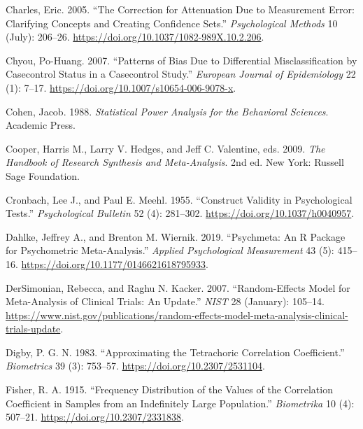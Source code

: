 \documentclass[
  letterpaper,
  DIV=11,
  numbers=noendperiod]{scrreprt}
\newlength{\cslhangindent}
\newlength{\cslentryspacingunit} %
\newenvironment{CSLReferences}[2] %
 {%
  \setlength{\parindent}{0pt}
  \ifodd #1
  \let\oldpar\par
  \def\par{\hangindent=\cslhangindent\oldpar}
  \fi
  \setlength{\parskip}{#2\cslentryspacingunit}
 }%
 {}
\begin{document}
\begin{CSLReferences}{1}{0}
\leavevmode{}%
Charles, Eric. 2005. {``The Correction for Attenuation Due to
Measurement Error: Clarifying Concepts and Creating Confidence Sets.''}
\emph{Psychological Methods} 10 (July): 206--26.
\url{https://doi.org/10.1037/1082-989X.10.2.206}.

\leavevmode{}%
Chyou, Po-Huang. 2007. {``Patterns of Bias Due to Differential
Misclassification by Case{\textendash}control Status in a
Case{\textendash}control Study.''} \emph{European Journal of
Epidemiology} 22 (1): 7--17.
\url{https://doi.org/10.1007/s10654-006-9078-x}.

\leavevmode{}%
Cohen, Jacob. 1988. \emph{Statistical Power Analysis for the Behavioral
Sciences}. Academic Press.

\leavevmode{}%
Cooper, Harris M., Larry V. Hedges, and Jeff C. Valentine, eds. 2009.
\emph{The Handbook of Research Synthesis and Meta-Analysis}. 2nd ed. New
York: Russell Sage Foundation.

\leavevmode{}%
Cronbach, Lee J., and Paul E. Meehl. 1955. {``Construct Validity in
Psychological Tests.''} \emph{Psychological Bulletin} 52 (4): 281--302.
\url{https://doi.org/10.1037/h0040957}.

\leavevmode{}%
Dahlke, Jeffrey A., and Brenton M. Wiernik. 2019. {``Psychmeta: An R
Package for Psychometric Meta-Analysis.''} \emph{Applied Psychological
Measurement} 43 (5): 415--16.
\url{https://doi.org/10.1177/0146621618795933}.

\leavevmode{}%
DerSimonian, Rebecca, and Raghu N. Kacker. 2007. {``Random-Effects Model
for Meta-Analysis of Clinical Trials: An Update.''} \emph{NIST} 28
(January): 105--14.
\url{https://www.nist.gov/publications/random-effects-model-meta-analysis-clinical-trials-update}.

\leavevmode{}%
Digby, P. G. N. 1983. {``Approximating the Tetrachoric Correlation
Coefficient.''} \emph{Biometrics} 39 (3): 753--57.
\url{https://doi.org/10.2307/2531104}.

\leavevmode{}%
Fisher, R. A. 1915. {``Frequency Distribution of the Values of the
Correlation Coefficient in Samples from an Indefinitely Large
Population.''} \emph{Biometrika} 10 (4): 507--21.
\url{https://doi.org/10.2307/2331838}.


\end{CSLReferences}
\end{document}
